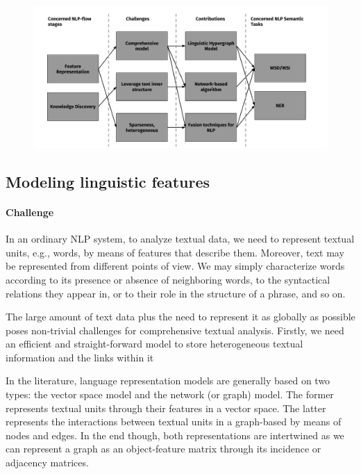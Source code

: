 \begin{figure}
\centering
\includegraphics[width=1\linewidth]{./images/Chapitre1/challenges_contribs.pdf}
\caption{}
\label{fig:challenges_contribs}
\end{figure}

\subsection{Modeling linguistic features}
\paragraph{Challenge}
In an ordinary NLP system, to analyze textual data, we need to represent textual units, e.g., words, by means of features that describe them.  Moreover, text may be represented from different points of view. We may simply characterize words according to its presence or absence of neighboring words, to the syntactical relations they appear in, or to their role in the structure of a phrase, and so on. 

The  large amount of text data plus the need to represent it as globally as possible poses non-trivial challenges for comprehensive textual analysis. Firstly, we need an efficient and straight-forward model to store heterogeneous textual information and the links within it

In the literature, language representation models are generally based on two types: the vector space model and the network (or graph) model. The former represents textual units through their features in a vector space. The latter represents the interactions between textual units in a graph-based by means of nodes and edges. In the end though, both representations are intertwined as we can represent a graph as an object-feature matrix through its incidence or adjacency matrices.


